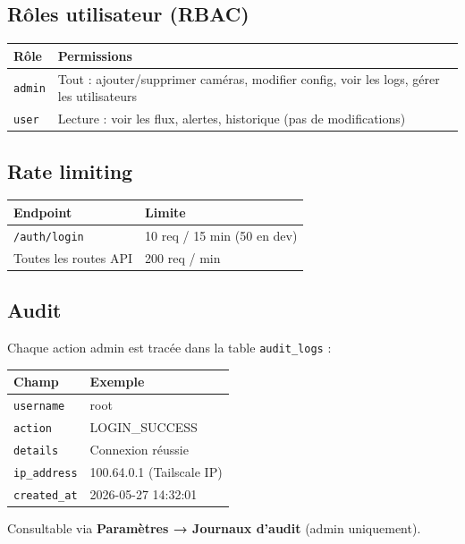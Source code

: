 \documentclass[12pt,a4paper]{article}
\begin{document}
\subsection{Rôles utilisateur (RBAC)}

\begin{longtable}{|l|p{10cm}|}
\hline
\textbf{Rôle} & \textbf{Permissions} \\
\hline
\endhead
\hline
\endfoot
\texttt{admin} & Tout : ajouter/supprimer caméras, modifier config, voir les logs, gérer les utilisateurs \\
\texttt{user} & Lecture : voir les flux, alertes, historique (pas de modifications) \\
\hline
\end{longtable}

\subsection{Rate limiting}

\begin{longtable}{|l|l|}
\hline
\textbf{Endpoint} & \textbf{Limite} \\
\hline
\endhead
\hline
\endfoot
\texttt{/auth/login} & 10 req / 15 min (50 en dev) \\
Toutes les routes API & 200 req / min \\
\hline
\end{longtable}

\subsection{Audit}

Chaque action admin est tracée dans la table \texttt{audit\_logs} :

\begin{longtable}{|l|l|}
\hline
\textbf{Champ} & \textbf{Exemple} \\
\hline
\endhead
\hline
\endfoot
\texttt{username} & root \\
\texttt{action} & LOGIN\_SUCCESS \\
\texttt{details} & Connexion réussie \\
\texttt{ip\_address} & 100.64.0.1 (Tailscale IP) \\
\texttt{created\_at} & 2026-05-27 14:32:01 \\
\hline
\end{longtable}

Consultable via \textbf{Paramètres → Journaux d'audit} (admin uniquement).
\end{document}
